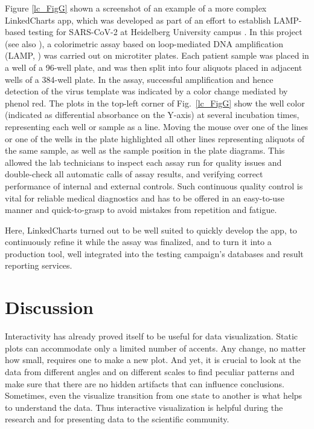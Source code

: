 \documentclass[twocolumn,10pt]{article}
\begin{document}
Figure \ref{lc_FigG} shown a screenshot of an example of a more complex LinkedCharts app, which was developed as part of an effort to establish LAMP-based testing for SARS-CoV-2 at Heidelberg University campus \citep{daothi_2020}. In this project (see also \citep{herbst_2021}), a colorimetric assay based on loop-mediated DNA amplification (LAMP, \citep{notomi_2000}) was carried out on microtiter plates. Each patient sample was placed in a well of a 96-well plate, and was then split into four aliquots placed in adjacent wells of a 384-well plate. In the assay, successful amplification  and hence detection of the virus template was indicated by a color change mediated by phenol red. The plots in the top-left corner of Fig.\ \ref{lc_FigG} show the well color (indicated as differential absorbance on the Y-axis) at several incubation times, representing each well or sample as a line. Moving the mouse over one of the lines or one of the wells in the plate highlighted all other lines representing aliquots of the same sample, as well as the sample position in the plate diagrams. This allowed the lab technicians to inspect each assay run for quality issues and double-check all automatic calls of assay results, and verifying correct performance of internal and external controls. Such continuous quality control is vital for reliable medical diagnostics and has to be offered in an easy-to-use manner and quick-to-grasp to avoid mistakes from repetition and fatigue.

Here, LinkedCharts turned out to be well suited to quickly develop the app, to continuously refine it while the assay was finalized, and to turn it into a production tool, well integrated into the testing campaign's databases and result reporting services.


\section{Discussion}

Interactivity has already proved itself to be useful for data visualization. Static plots can accommodate only a limited number of accents. Any change, no matter how small, requires one to make a new plot. And yet, it is crucial to look at the data from different angles and on different scales to find peculiar patterns and make sure that there are no hidden artifacts that can influence conclusions. Sometimes, even the visualize transition from one state to another is what helps to understand the data. Thus interactive visualization is helpful during the research and for presenting data to the scientific community.
\end{document}
